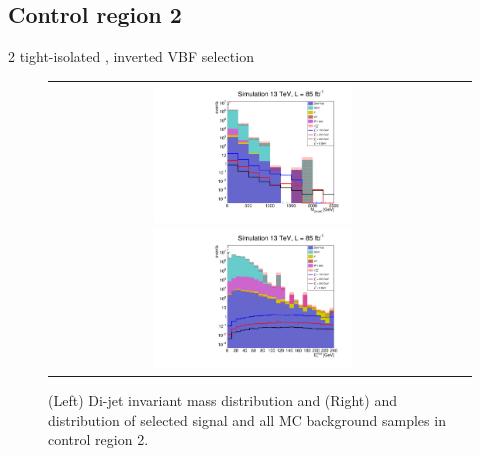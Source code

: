 \subsection*{Control region 2}

\FloatBarrier

2 tight-isolated \hadtau, inverted VBF selection

\begin{figure}[tbh!]
	\centering
	\begin{tabular}{cc}
		\includegraphics[width=0.5\textwidth]{analysis/pics/h_dijetinvariantmass_Tau2TightIsoVBFInverted.pdf}
		\includegraphics[width=0.5\textwidth]{analysis/pics/h_met_Tau2TightIsoVBFInverted.pdf}
	\end{tabular}
	\caption{(Left) Di-jet invariant mass distribution and (Right) and \met distribution of selected signal and all MC background samples in control region 2.}
	\label{fig::crplots1_Tau2TightIsoVBFInverted_13tev}
\end{figure}

